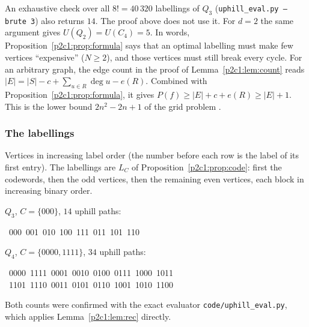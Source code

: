 \begin{remark}
An exhaustive check over all $8!=40\,320$ labellings of $Q_3$ (\texttt{uphill\_eval.py --brute 3})
also returns $14$. The proof above does not use it. For $d=2$ the same argument gives
$U(Q_2)=U(C_4)=5$. In words, Proposition~\ref{p2c1:prop:formula} says that an optimal labelling
must make few vertices ``expensive'' ($N\ge2$), and those vertices must still break every cycle.
For an arbitrary graph, the edge count in the proof of Lemma~\ref{p2c1:lem:count} reads
$|E|=|S|-c+\sum_{u\in R}\deg u-e(R)$. Combined with Proposition~\ref{p2c1:prop:formula}, it gives
$P(f)\ge|E|+c+e(R)\ge|E|+1$. This is the lower bound $2n^2-2n+1$ of the grid problem
\cite{IMO22}.
\end{remark}

\subsubsection{The labellings}\label{p2c1:sec:lab}

Vertices in increasing label order (the number before each row is the label of its first
entry). The labellings are $L_C$ of Proposition~\ref{p2c1:prop:code}: first the codewords, then
the odd vertices, then the remaining even vertices, each block in increasing binary order.

\medskip\noindent$Q_3$, $C=\{000\}$, $14$ uphill paths:
\begin{flushleft}\small\ttfamily
{}\ 000\ 001\ 010\ 100\ 111\ 011\ 101\ 110\\
\end{flushleft}
\noindent$Q_4$, $C=\{0000,1111\}$, $34$ uphill paths:
\begin{flushleft}\small\ttfamily
{}\ 0000\ 1111\ 0001\ 0010\ 0100\ 0111\ 1000\ 1011\\
\ 1101\ 1110\ 0011\ 0101\ 0110\ 1001\ 1010\ 1100\\
\end{flushleft}
Both counts were confirmed with the exact evaluator \texttt{code/uphill\_eval.py}, which applies
Lemma~\ref{p2c1:lem:rec} directly.
